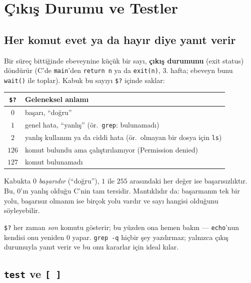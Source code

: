 \documentclass[11pt,a4paper]{article}
\newcommand{\term}[1]{\textbf{\color{mintdeep}#1}}
\newcommand{\cmd}[1]{\texttt{#1}}
\begin{document}
\section{Çıkış Durumu ve Testler}
\label{sec:status}

\subsection{Her komut evet ya da hayır diye yanıt verir}

Bir süreç bittiğinde ebeveynine küçük bir sayı, \term{çıkış durumunu} (exit status) döndürür (C'de \cmd{main}'den \cmd{return n} ya da \cmd{exit(n)}, 3. hafta; ebeveyn bunu \cmd{wait()} ile toplar). Kabuk bu sayıyı \texttt{\$?} içinde saklar:



\begin{center}
\small
\begin{tabular}{@{}cl@{}}
\toprule
\texttt{\$?} & \textbf{Geleneksel anlamı}\\
\midrule
$0$ & başarı, “doğru”\\
$1$ & genel hata, “yanlış” (ör.\ \cmd{grep}: bulunamadı)\\
$2$ & yanlış kullanım ya da ciddi hata (ör.\ olmayan bir dosya için \cmd{ls})\\
$126$ & komut bulundu ama çalıştırılamıyor (Permission denied)\\
$127$ & komut bulunamadı\\
\bottomrule
\end{tabular}
\end{center}

\begin{keyidea}
Kabukta $0$ \emph{başarıdır} (“doğru”), $1$ ile $255$ arasındaki her değer ise başarısızlıktır. Bu, $0$'ın yanlış olduğu C'nin tam tersidir. Mantıklıdır da: başarmanın tek bir yolu, başarısız olmanın ise birçok yolu vardır ve sayı hangisi olduğunu söyleyebilir.
\end{keyidea}

\texttt{\$?} her zaman \emph{son} komutu gösterir; bu yüzden ona hemen bakın --- \cmd{echo}'nun kendisi onu yeniden $0$ yapar. \cmd{grep -q} hiçbir şey yazdırmaz; yalnızca çıkış durumuyla yanıt verir ve bu onu kararlar için ideal kılar.

\subsection{\texttt{test} ve \texttt{[ ]}}
\end{document}
